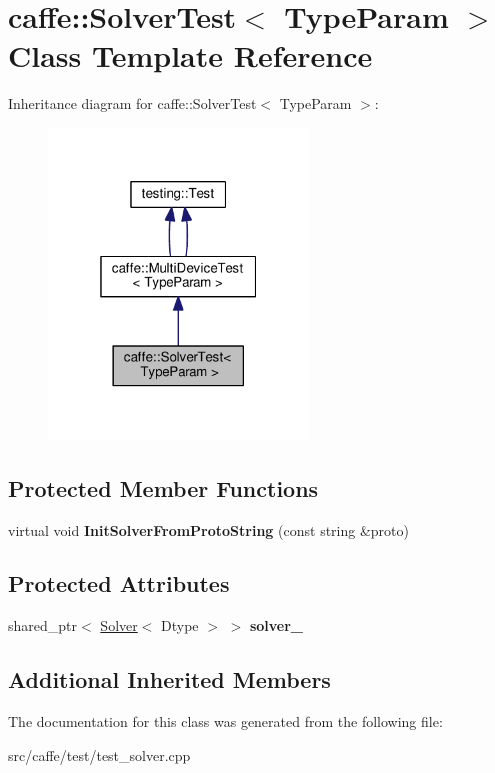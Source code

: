 \hypertarget{classcaffe_1_1_solver_test}{}\section{caffe\+:\+:Solver\+Test$<$ Type\+Param $>$ Class Template Reference}
\label{classcaffe_1_1_solver_test}


Inheritance diagram for caffe\+:\+:Solver\+Test$<$ Type\+Param $>$\+:
\nopagebreak
\begin{figure}[H]
\begin{center}
\leavevmode
\includegraphics[width=196pt]{classcaffe_1_1_solver_test__inherit__graph}
\end{center}
\end{figure}
\subsection*{Protected Member Functions}
\begin{DoxyCompactItemize}
\item 
\mbox{\label{classcaffe_1_1_solver_test_a9aa6680c377ba98f370495090c7fa514}} 
virtual void {\bfseries Init\+Solver\+From\+Proto\+String} (const string \&proto)
\end{DoxyCompactItemize}
\subsection*{Protected Attributes}
\begin{DoxyCompactItemize}
\item 
\mbox{\label{classcaffe_1_1_solver_test_a05fe167060d4fefd08cf7116c7f984a7}} 
shared\+\_\+ptr$<$ \mbox{\hyperlink{classcaffe_1_1_solver}{Solver}}$<$ Dtype $>$ $>$ {\bfseries solver\+\_\+}
\end{DoxyCompactItemize}
\subsection*{Additional Inherited Members}


The documentation for this class was generated from the following file\+:\begin{DoxyCompactItemize}
\item 
src/caffe/test/test\+\_\+solver.\+cpp\end{DoxyCompactItemize}
